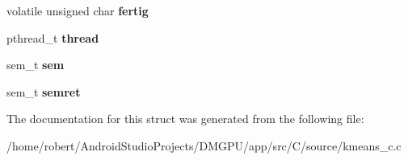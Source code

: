 \begin{DoxyCompactItemize}
\item 
\mbox{\label{structkmeans__pt_ad2580bc7fb5eac708522af779db2d54c}} 
volatile unsigned char {\bfseries fertig}
\item 
\mbox{\label{structkmeans__pt_a2648d7c598e20fdf23e9d30f43b4b17c}} 
pthread\+\_\+t {\bfseries thread}
\item 
\mbox{\label{structkmeans__pt_af1c42a889c6180d899cb41066d2884c0}} 
sem\+\_\+t {\bfseries sem}
\item 
\mbox{\label{structkmeans__pt_aa959612fc7e6fa42798130bbf1c437a7}} 
sem\+\_\+t {\bfseries semret}
\end{DoxyCompactItemize}


The documentation for this struct was generated from the following file\+:\begin{DoxyCompactItemize}
\item 
/home/robert/\+Android\+Studio\+Projects/\+D\+M\+G\+P\+U/app/src/\+C/source/kmeans\+\_\+c.\+c\end{DoxyCompactItemize}
